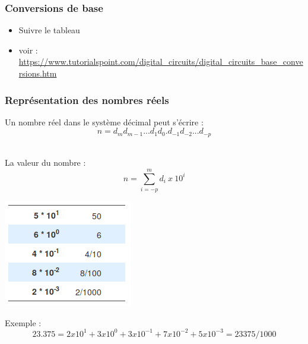 \documentclass{beamer}
\begin{document}
\begin{frame}
	\frametitle{Conversions de base}
	
	\begin{itemize}
		\item Suivre le tableau
		\item voir : \url{https://www.tutorialspoint.com/digital_circuits/digital_circuits_base_conversions.htm}
	\end{itemize}
	\normalsize
\end{frame}



\begin{frame}
\frametitle{Représentation des nombres réels}

\begin{itemize}
\item Un nombre réel dans le système décimal peut s'écrire :\\
  $$n = d_md_{m-1}...d_1d_0.d_{-1}d_{-2}...d_{-p}$$\\
  
\begin{minipage}[b]{0.6\linewidth} 
	\item La valeur du nombre :
  		$$n=\sum_{i=-p}^{m} d_i~x~10^i $$
\end{minipage}
\begin{minipage}[b]{0.38\linewidth} 
	\centering
	\includegraphics[trim = 0cm 0cm 0cm 0cm, clip,scale=0.3]{figs/positivePower.png} 
\end{minipage}
\item  Exemple : $$23.375=2x10^1+3x10^0+3x10^{-1}+7x10^{-2}+5x10^{-3}=23375/1000$$
\end{itemize}
\end{frame}
\end{document}
